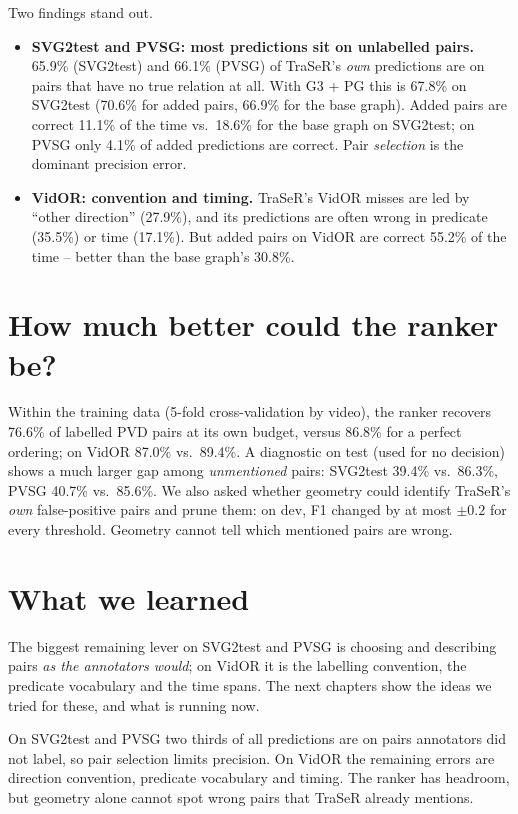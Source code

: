 \documentclass[11pt,openany]{book}
\newcommand{\lsec}{\section*{What we learned}}
\begin{document}
Two findings stand out.
\begin{itemize}
  \item \textbf{SVG2test and PVSG: most predictions sit on unlabelled pairs.} 65.9\% (SVG2test) and 66.1\% (PVSG) of TraSeR's
  \emph{own} predictions are on pairs that have no true relation at all. With G3 + PG this is 67.8\% on SVG2test (70.6\% for added
  pairs, 66.9\% for the base graph). Added pairs are correct 11.1\% of the time vs.\ 18.6\% for the base graph on SVG2test; on PVSG
  only 4.1\% of added predictions are correct. Pair \emph{selection} is the dominant precision error.
  \item \textbf{VidOR: convention and timing.} TraSeR's VidOR misses are led by ``other direction'' (27.9\%), and its predictions are
  often wrong in predicate (35.5\%) or time (17.1\%). But added pairs on VidOR are correct 55.2\% of the time -- better than the base
  graph's 30.8\%.
\end{itemize}

\section*{How much better could the ranker be?}
Within the training data (5-fold cross-validation by video), the ranker recovers 76.6\% of labelled PVD pairs at its own budget,
versus 86.8\% for a perfect ordering; on VidOR 87.0\% vs.\ 89.4\%. A diagnostic on test (used for no decision) shows a much larger gap
among \emph{unmentioned} pairs: SVG2test 39.4\% vs.\ 86.3\%, PVSG 40.7\% vs.\ 85.6\%. We also asked whether geometry could identify
TraSeR's \emph{own} false-positive pairs and prune them: on dev, F1 changed by at most $\pm 0.2$ for every threshold. Geometry
cannot tell which mentioned pairs are wrong.

\lsec
The biggest remaining lever on SVG2test and PVSG is choosing and describing pairs \emph{as the annotators would}; on VidOR it is the
labelling convention, the predicate vocabulary and the time spans. The next chapters show the ideas we tried for these, and what
is running now.

\begin{summarybox}
On SVG2test and PVSG two thirds of all predictions are on pairs annotators did not label, so pair selection limits precision. On
VidOR the remaining errors are direction convention, predicate vocabulary and timing. The ranker has headroom, but geometry alone
cannot spot wrong pairs that TraSeR already mentions.
\end{summarybox}
\end{document}
